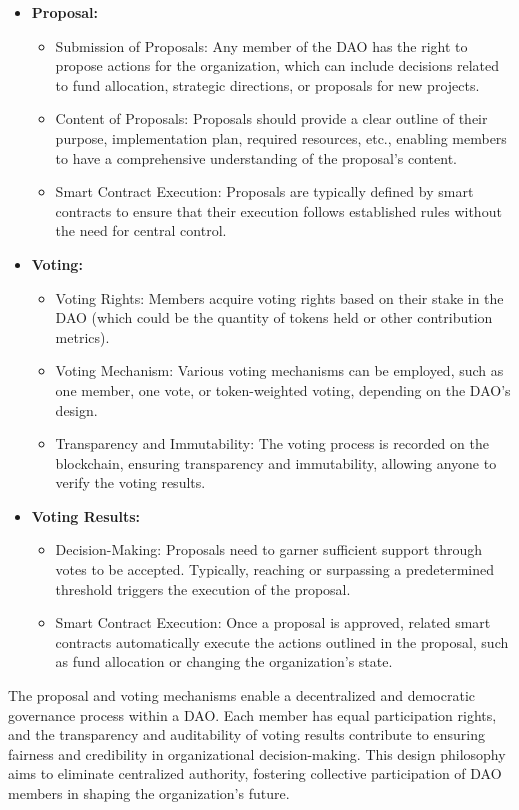 \documentclass[lettersize,journal]{IEEEtran}
\begin{document}
\begin{itemize}
  \item \textbf{Proposal:}
  \begin{itemize}
    \item Submission of Proposals: Any member of the DAO has the right to propose actions for the organization, which can include decisions related to fund allocation, strategic directions, or proposals for new projects.
    \item Content of Proposals: Proposals should provide a clear outline of their purpose, implementation plan, required resources, etc., enabling members to have a comprehensive understanding of the proposal's content.
    \item Smart Contract Execution: Proposals are typically defined by smart contracts to ensure that their execution follows established rules without the need for central control.
  \end{itemize}
  \item \textbf{Voting:}
  \begin{itemize}
    \item Voting Rights: Members acquire voting rights based on their stake in the DAO (which could be the quantity of tokens held or other contribution metrics).
    \item Voting Mechanism: Various voting mechanisms can be employed, such as one member, one vote, or token-weighted voting, depending on the DAO's design.
    \item Transparency and Immutability: The voting process is recorded on the blockchain, ensuring transparency and immutability, allowing anyone to verify the voting results.
  \end{itemize}
  \item \textbf{Voting Results:}
  \begin{itemize}
    \item Decision-Making: Proposals need to garner sufficient support through votes to be accepted. Typically, reaching or surpassing a predetermined threshold triggers the execution of the proposal.
    \item Smart Contract Execution: Once a proposal is approved, related smart contracts automatically execute the actions outlined in the proposal, such as fund allocation or changing the organization's state.
  \end{itemize}
\end{itemize}

The proposal and voting mechanisms enable a decentralized and democratic governance process within a DAO. Each member has equal participation rights, and the transparency and auditability of voting results contribute to ensuring fairness and credibility in organizational decision-making. This design philosophy aims to eliminate centralized authority, fostering collective participation of DAO members in shaping the organization's future.
\end{document}
